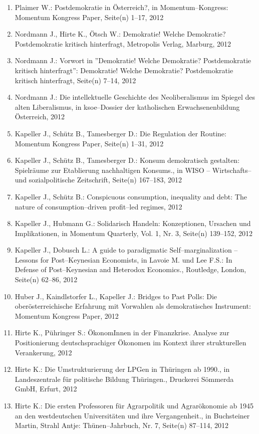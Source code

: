 \begin{enumerate}
	 \item Plaimer W.: Postdemokratie in Österreich?, in Momentum--Kongress: Momentum Kongress Paper, Seite(n) 1--17, 2012
	 \item Nordmann J., Hirte K., Ötsch W.: Demokratie! Welche Demokratie? Postdemokratie kritisch hinterfragt, Metropolis Verlag, Marburg, 2012
	 \item Nordmann J.: Vorwort in ''Demokratie! Welche Demokratie? Postdemokratie kritisch hinterfragt'': Demokratie! Welche Demokratie? Postdemokratie kritisch hinterfragt, Seite(n) 7--14, 2012
	 \item Nordmann J.: Die intellektuelle Geschichte des Neoliberalismus im Spiegel des alten Liberalismus, in ksoe--Dossier der katholischen Erwachsenenbildung Österreich, 2012
	 \item Kapeller J., Schütz B., Tamesberger D.: Die Regulation der Routine: Momentum Kongress Paper, Seite(n) 1--31, 2012
	 \item Kapeller J., Schütz B., Tamesberger D.: Konsum demokratisch gestalten: Spielräume zur Etablierung nachhaltigen Konsums., in WISO -- Wirtschafts-- und sozialpolitische Zeitschrift, Seite(n) 167--183, 2012
	 \item Kapeller J., Schütz B.: Conspicuous consumption, inequality and debt: The nature of consumption--driven profit--led regimes, 2012
	 \item Kapeller J., Hubmann G.: Solidarisch Handeln: Konzeptionen, Ursachen und Implikationen, in Momentum Quarterly, Vol. 1, Nr. 3, Seite(n) 139--152, 2012
	 \item Kapeller J., Dobusch L.: A guide to paradigmatic Self--marginalization -- Lessons for Post--Keynesian Economists, in Lavoie M. und Lee F.S.: In Defense of Post--Keynesian and Heterodox Economics., Routledge, London, Seite(n) 62--86, 2012
	 \item Huber J., Kaindlstorfer L., Kapeller J.: Bridges to Past Polls: Die oberösterreichische Erfahrung mit Vorwahlen als demokratisches Instrument: Momentum Kongress Paper, 2012
	 \item Hirte K., Pühringer S.: ÖkonomInnen in der Finanzkrise. Analyse zur Positionierung deutschsprachiger Ökonomen im Kontext ihrer strukturellen Verankerung, 2012
	 \item Hirte K.: Die Umstrukturierung der LPGen in Thüringen ab 1990., in Landeszentrale für politische Bildung Thüringen., Druckerei Sömmerda GmbH, Erfurt, 2012
	 \item Hirte K.: Die ersten Professoren für Agrarpolitik und Agrarökonomie ab 1945 an den westdeutschen Universitäten und ihre Vergangenheit., in Buchsteiner Martin, Strahl Antje: Thünen--Jahrbuch, Nr. 7, Seite(n) 87--114, 2012

\end{enumerate}
